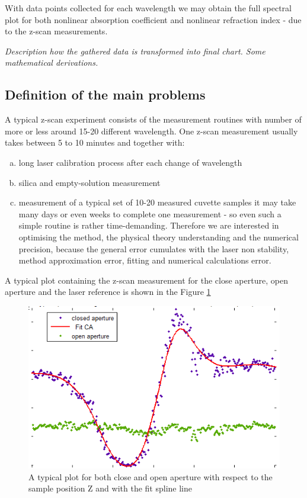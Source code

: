 \documentclass[12pt,twoside,a4paper]{article}
\numberwithin{equation}{subsection}
\numberwithin{figure}{subsection}
\begin{document}
With data points collected for each wavelength we may obtain the full spectral plot for both nonlinear absorption coefficient and
nonlinear refraction index - due to the z-scan measurements.

\textit{Description how the gathered data is transformed into final chart. Some mathematical derivations.}

\subsection{Definition of the main problems} \label{chap:zscan_problems}

A typical z-scan experiment consists of the measurement routines with number of more or less around 15-20 different wavelength. One
z-scan measurement usually takes between 5 to 10 minutes and together with:
\begin{enumerate}[(a)]
  \item long laser calibration process after each change of wavelength
  \item silica and empty-solution measurement
  \item measurement of a typical set of 10-20 measured cuvette samples it may take many days or even weeks to complete one
  measurement - so even such a simple routine is rather time-demanding. Therefore we are interested in optimising the method, the
  physical theory understanding and the numerical precision, because the general error cumulates with the laser non stability,
  method approximation error, fitting and numerical calculations error. 
\end{enumerate}

A typical plot containing the z-scan measurement for  the close aperture, open aperture and the laser reference is shown in the
Figure \ref{fig:zscan_both}

\begin{figure} 
  \includegraphics{img/zscan_both.png}
  \caption{A typical plot for both close and open aperture with respect to the sample position Z and with the fit spline line
  \label{fig:zscan_both}} 
\end{figure}
\end{document}
